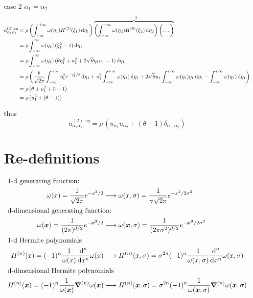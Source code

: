 \documentclass[draft]{article}
\begin{document}
case 2 $\alpha_1 = \alpha_2$
\small
\begin{align*}
	a^{(2),eq}_{\alpha_1\alpha_1} &= \rho \left ( \int_{-\infty}^{+\infty} \omega(\eta_1) H^{(2)}({\xi_1}) \,\text{d} \eta_1 \right ) \overbrace{\left ( \int_{-\infty}^{+\infty} \omega(\eta_2) H^{(0)} ({\xi_2}) \,\text{d} \eta_2 \right ) \left ( \dots \vphantom{\int} \right )}^{= \, 1} \\
	                              &= \rho \int_{-\infty}^{\infty} \omega(\eta_1) \, (\xi_1^2 - 1) \,\text{d} \eta_1 \\
	                              &= \rho \int_{-\infty}^{\infty} \omega(\eta_1) \, (\theta \eta_1^2 + u_1^2 + 2\sqrt{\theta}\eta_1 u_1 - 1) \,\text{d} \eta_1 \\
	                              &= \rho \left ( \frac{\theta}{\sqrt{2\pi}} \int_{-\infty}^{+\infty} \eta_1^2 e^{-\eta_{1}^2 / 2} \,\text{d} \eta_1 + u_1^2 \int_{-\infty}^{+\infty} \omega(\eta_1) \,\text{d} \eta_1 + 2\sqrt{\theta}u_1 \int_{-\infty}^{+\infty} \omega(\eta_1) \eta_1 \,\text{d} \eta_1 - \int_{-\infty}^{+\infty} \omega(\eta_1) \,\text{d} \eta_1 \right ) \\
	                              &= \rho \, (\theta + u_1^2 + 0 - 1) \\
	                              &= \rho \, (u_1^2 + (\theta - 1))
\end{align*}
\normalsize

thus
\[
a^{(2),eq}_{\alpha_1 \alpha_2} = \rho \, (u_{\alpha_1} u_{\alpha_2} + (\theta - 1) \delta_{\alpha_1, \alpha_2})
\]

\clearpage

\section*{Re-definitions}
\renewcommand{\theequation}{\arabic{equation}}
\setcounter{equation}{0}
\begin{align}
	\intertext{1-d generating function:}
	\omega(x) = \frac{1}{\sqrt{2\pi}} e^{-x^2 / 2} &\longrightarrow \omega(x, \sigma) = \frac{1}{\sigma \sqrt{2\pi}} e^{-x^2 / 2 \sigma^2} \label{new_1d_generating_function} \\
	\intertext{d-dimensional generating function:}
	\omega(\bm{x}) = \frac{1}{(2\pi)^{d/2}} e^{-\bm{x^2} / 2} &\longrightarrow \omega(\bm{x}, \sigma) = \frac{1}{(2\pi \sigma^2)^{d/2}} e^{-\bm{x^2} / 2 \sigma^2} \label{new_d_generating_function} \\
	\intertext{1-d Hermite polynomials}
	H^{(n)}(x) = (-1)^{n} \frac{1}{\omega(x)} \frac{\text{d}^n}{\text{d}x^n} \omega(x) &\longrightarrow H^{(n)}(x, \sigma) = \sigma^{2n} (-1)^{n} \frac{1}{\omega(x, \sigma)} \frac{\text{d}^n}{\text{d}x^n} \omega(x, \sigma) \label{new_1d_hermite_polynomial} \\
	\intertext{d-dimensional Hermite polynomials}
	H^{(n)}(\bm{x}) = (-1)^{n} \frac{1}{\omega(\bm{x})} \bm{\nabla}^{(n)} \omega(\bm{x}) &\longrightarrow H^{(n)}(\bm{x}, \sigma) = \sigma^{2n} (-1)^{n} \frac{1}{\omega(\bm{x}, \sigma)} \bm{\nabla}^{(n)} \omega(\bm{x}, \sigma) \label{new_d_hermite_polynomial}
\end{align}
\end{document}

